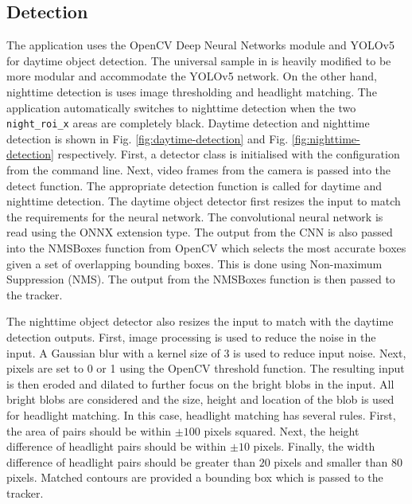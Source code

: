 \documentclass[12pt,a4paper,fleqn]{report}
\begin{document}
\subsection{Detection}
The application uses the OpenCV Deep Neural Networks module and YOLOv5 for daytime object detection.
The universal sample in \cite{opencvyolosample:2022} is heavily modified to be more modular and
accommodate the YOLOv5 network.
On the other hand, nighttime detection is uses image thresholding and headlight matching.
The application automatically switches to nighttime detection when the two \texttt{night_roi_x}
areas are completely black.
Daytime detection and nighttime detection is shown in Fig. \ref{fig:daytime-detection} and Fig.
\ref{fig:nighttime-detection} respectively.
First, a detector class is initialised with the configuration from the command line.
Next, video frames from the camera is passed into the detect function.
The appropriate detection function is called for daytime and nighttime detection.
The daytime object detector first resizes the input to match the requirements for the neural network.
The convolutional neural network is read using the ONNX extension type.
The output from the CNN is also passed into the NMSBoxes function from OpenCV which selects the most
accurate boxes given a set of overlapping bounding boxes.
This is done using Non-maximum Suppression (NMS).
The output from the NMSBoxes function is then passed to the tracker.

The nighttime object detector also resizes the input to match with the daytime detection outputs.
First, image processing is used to reduce the noise in the input.
A Gaussian blur with a kernel size of 3 is used to reduce input noise.
Next, pixels are set to 0 or 1 using the OpenCV threshold function.
The resulting input is then eroded and dilated to further focus on the bright blobs in the input.
All bright blobs are considered and the size, height and location of the blob is used for
headlight matching.
In this case, headlight matching has several rules.
First, the area of pairs should be within $\pm100$ pixels squared.
Next, the height difference of headlight pairs should be within $\pm 10$ pixels.
Finally, the width difference of headlight pairs should be greater than $20$ pixels and smaller than $80$
pixels.
Matched contours are provided a bounding box which is passed to the tracker.
\end{document}
